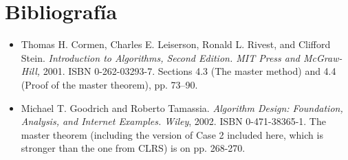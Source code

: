 \documentclass[12pt, letterpaper]{article} %
\begin{document}
    \section{Bibliografía} \hline

\begin{itemize}
    \item Thomas H. Cormen, Charles E. Leiserson, Ronald L. Rivest, and Clifford Stein. \textit{Introduction to Algorithms, Second Edition. MIT Press and McGraw-Hill,} 2001. ISBN 0-262-03293-7. Sections 4.3 (The master method) and 4.4 (Proof of the master theorem), pp. 73–90.
    \item Michael T. Goodrich and Roberto Tamassia. \textit{ Algorithm Design: Foundation, Analysis, and Internet Examples. Wiley}, 2002. ISBN 0-471-38365-1. The master theorem (including the version of Case 2 included here, which is stronger than the one from CLRS) is on pp. 268-270.
  \end{itemize}

    
    
     
  
\end{document}
